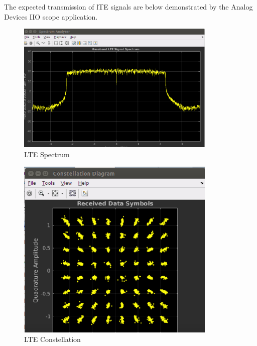 The expected transmission of lTE signals are below demonstrated by the Analog
Devices IIO scope application.

\begin{figure}[htbp]
    \centering
    \includegraphics[width=0.85\textwidth]{./figures/lte_spectrum_iio}
    \caption{ LTE Spectrum
    \label{fig:ltespectrumiio}}
\end{figure}

\begin{figure}[htbp]
    \centering
    \includegraphics[width=0.85\textwidth]{./figures/lte_constellation_iio}
    \caption{ LTE Constellation
    \label{fig:lteconstellationiio}}
\end{figure}

